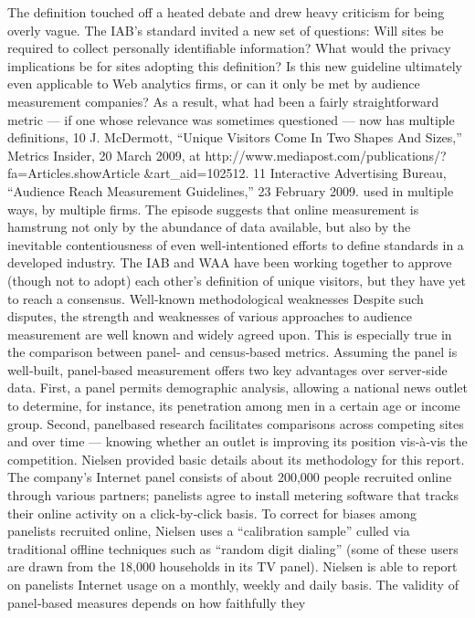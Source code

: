 The definition touched off a heated debate and drew heavy criticism for
being overly vague. The IAB’s standard invited a new set of questions:
Will sites be required to collect personally identifiable information? What
would the privacy implications be for sites adopting this definition? Is this
new guideline ultimately even applicable to Web analytics firms, or can it
only be met by audience measurement companies?
As a result, what had been a fairly straightforward metric — if one whose
relevance was sometimes questioned — now has multiple definitions,
10 J. McDermott, ``Unique Visitors Come In Two Shapes And Sizes,'' Metrics Insider,
20 March 2009, at http://www.mediapost.com/publications/?fa=Articles.showArticle
&art_aid=102512.
11 Interactive Advertising Bureau, ``Audience Reach Measurement Guidelines,'' 23
February 2009.
used in multiple ways, by multiple firms. The episode suggests that online
measurement is hamstrung not only by the abundance of data available,
but also by the inevitable contentiousness of even well‐intentioned efforts
to define standards in a developed industry. The IAB and WAA have been
working together to approve (though not to adopt) each other’s definition
of unique visitors, but they have yet to reach a consensus.
Well‐known methodological weaknesses
Despite such disputes, the strength and weaknesses of various approaches
to audience measurement are well known and widely agreed upon. This is
especially true in the comparison between panel‐ and census‐based
metrics.
Assuming the panel is well‐built, panel‐based measurement offers two
key advantages over server‐side data. First, a panel permits demographic
analysis, allowing a national news outlet to determine, for instance, its
penetration among men in a certain age or income group. Second, panelbased
research facilitates comparisons across competing sites and over
time — knowing whether an outlet is improving its position vis‐à‐vis the
competition.
Nielsen provided basic details about its methodology for this report. The
company’s Internet panel consists of about 200,000 people recruited online
through various partners; panelists agree to install metering software that
tracks their online activity on a click‐by‐click basis. To correct for biases
among panelists recruited online, Nielsen uses a ``calibration sample''
culled via traditional offline techniques such as ``random digit dialing''
(some of these users are drawn from the 18,000 households in its TV
panel). Nielsen is able to report on panelists Internet usage on a monthly,
weekly and daily basis.
The validity of panel‐based measures depends on how faithfully they
